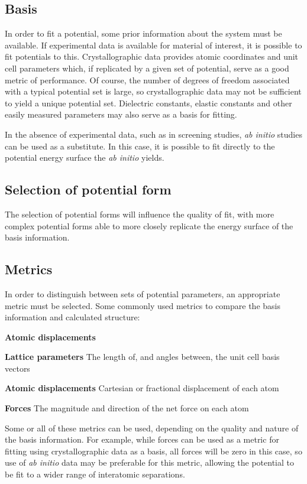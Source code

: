 \subsection{Basis}
In order to fit a potential, some prior information about the system must be available. 
If experimental data is available for material of interest, it is possible to fit potentials to this.
Crystallographic data provides atomic coordinates and unit cell parameters which, if replicated by a given set of potential, serve as a good metric of performance.
Of course, the number of degrees of freedom associated with a typical potential set is large, so crystallographic data may not be sufficient to yield a unique potential set.
Dielectric constants, elastic constants and other easily measured parameters may also serve as a basis for fitting.

In the absence of experimental data, such as in screening studies, \textit{ab initio} studies can be used as a substitute. 
In this case, it is possible to fit directly to the potential energy surface the \textit{ab initio} yields.

\subsection{{\color{red}Selection of potential form}}
The selection of potential forms will influence the quality of fit, with more complex potential forms able to more closely replicate the energy surface of the basis information.


\subsection{Metrics}
In order to distinguish between sets of potential parameters, an appropriate metric must be selected.
Some commonly used metrics to compare the basis information and calculated structure:
\begin{labeling}{\textbf{Atomic displacements}}
	\item [\textbf{Lattice parameters}] The length of, and angles between, the unit cell basis vectors
	\item [\textbf{Atomic displacements}] Cartesian or fractional displacement of each atom
	\item [\textbf{Forces}] The magnitude and direction of the net force on each atom
\end{labeling}
Some or all of these metrics can be used, depending on the quality and nature of the basis information.
For example, while forces can be used as a metric for fitting using crystallographic data as a basis, all forces will be zero in this case, so use of \textit{ab initio} data may be preferable for this metric, allowing the potential to be fit to a wider range of interatomic separations.

